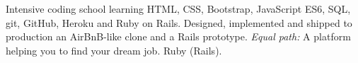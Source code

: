 \documentclass[11pt,a4paper,sans]{moderncv}
\begin{document}
{Intensive coding school learning HTML, CSS, Bootstrap, JavaScript ES6,
SQL, git, GitHub, Heroku and Ruby on Rails. Designed, implemented and shipped to
production an AirBnB-like clone and a Rails prototype.
{{\textit{Equal path:} A platform helping you to find your dream job. Ruby (Rails). \href{https://youtu.be/hb8TT6Z1ptE?t=3828}   {} \href{http://equal-path.herokuapp.com/}   {}}
}}
\end{document}
